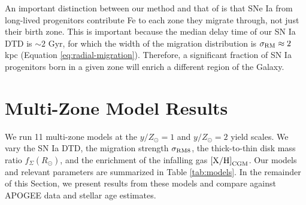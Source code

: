 \documentclass[twocolumn,twocolappendix]{aastex701}
\newcommand{\yZ}[1]{$y/Z_\odot=#1$}
\begin{document}
An important distinction between our method and that of \citet{spitoni_effect_2015} is that SNe Ia from long-lived progenitors contribute Fe to each zone they migrate through, not just their birth zone. This is important because the median delay time of our SN Ia DTD is $\sim2$ Gyr, for which the width of the migration distribution is $\sigma_{\rm RM}\approx2$ kpc (Equation \ref{eq:radial-migration}). Therefore, a significant fraction of SN Ia progenitors born in a given zone will enrich a different region of the Galaxy.

\section{Multi-Zone Model Results}
\label{sec:multizone-results}

We run 11 multi-zone models at the \yZ{1} and \yZ{2} yield scales. We vary the SN Ia DTD, the migration strength $\sigma_{\rm RM8}$, the thick-to-thin disk mass ratio $f_\Sigma(R_\odot)$, and the enrichment of the infalling gas ${\rm [X/H]}_{\rm CGM}$. Our models and relevant parameters are summarized in Table \ref{tab:models}. In the remainder of this Section, we present results from these models and compare against APOGEE data and stellar age estimates.
\end{document}

